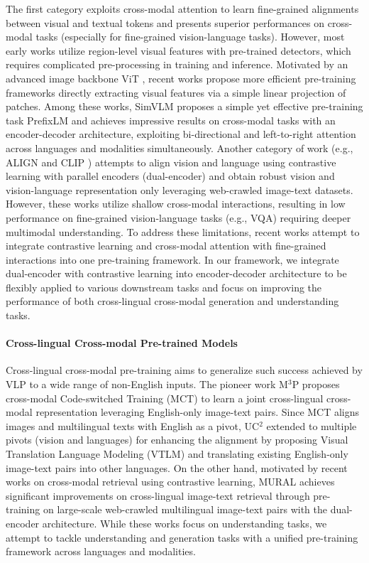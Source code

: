 \documentclass{article}
\begin{document}
The first category exploits cross-modal attention to learn fine-grained alignments between visual and textual tokens and presents superior performances on cross-modal tasks (especially for fine-grained vision-language tasks). However, most early works utilize region-level visual features with pre-trained detectors, which requires complicated pre-processing in training and inference. Motivated by an advanced image backbone ViT \cite{vit2020}, recent works \cite{Kim2021ViLTVT,simvlm2021,dou2022an} propose more efficient pre-training frameworks directly extracting visual features via a simple linear projection of patches. Among these works, SimVLM \cite{simvlm2021} proposes a simple yet effective pre-training task PrefixLM and achieves impressive results on cross-modal tasks with an encoder-decoder architecture, exploiting bi-directional and left-to-right attention across languages and modalities simultaneously. Another category of work (e.g., ALIGN \cite{Jia2021ScalingUV} and CLIP \cite{Radford2021LearningTV}) attempts to align vision and language using contrastive learning with parallel encoders (dual-encoder) and obtain robust vision and vision-language representation only leveraging web-crawled image-text datasets. However, these works utilize shallow cross-modal interactions, resulting in low performance on fine-grained vision-language tasks (e.g., VQA) requiring deeper multimodal understanding. To address these limitations, recent works \cite{Yuan2021FlorenceAN,Singh2021FLAVAAF,albef2021} attempt to integrate contrastive learning and cross-modal attention with fine-grained interactions into one pre-training framework. In our framework, we integrate dual-encoder with contrastive learning into encoder-decoder architecture to be flexibly applied to various downstream tasks and focus on improving the performance of both cross-lingual cross-modal generation and understanding tasks.

\paragraph{Cross-lingual Cross-modal Pre-trained Models}
Cross-lingual cross-modal pre-training aims to generalize such success achieved by VLP to a wide range of non-English inputs. The pioneer work M$^3$P \cite{m3p2020} proposes cross-modal Code-switched Training (MCT) to learn a joint cross-lingual cross-modal representation leveraging English-only image-text pairs. Since MCT aligns images and multilingual texts with English as a pivot, UC$^2$ \cite{UC22021} extended to multiple pivots (vision and languages) for enhancing the alignment by proposing Visual Translation Language Modeling (VTLM) and translating existing English-only image-text pairs into other languages. On the other hand, motivated by recent works on cross-modal retrieval using contrastive learning, MURAL \cite{mural2021} achieves significant improvements on cross-lingual image-text retrieval through pre-training on large-scale web-crawled multilingual image-text pairs with the dual-encoder architecture. While these works focus on understanding tasks, we attempt to tackle understanding and generation tasks with a unified pre-training framework across languages and modalities. 
\end{document}
